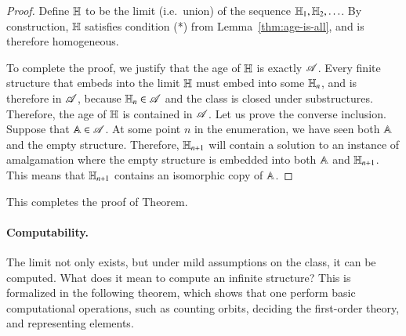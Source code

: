 \begin{proof}
		 Define $\mathbb H$ to be the limit (i.e.~union) of the sequence $\mathbb H_1,\mathbb H_2,\ldots$.  By construction, $\mathbb H$ satisfies condition (*) from Lemma~\ref{thm:age-is-all}, and is therefore homogeneous. 


		 
		 To complete the proof, we justify that the age of $\mathbb H$ is exactly $\mathscr A$. 
		 Every finite structure that embeds into the limit $\mathbb H$ must embed into some $\mathbb H_n$, and is therefore in $\mathscr A$, because $\mathbb H_n \in \mathscr A$ and the class is closed under substructures. Therefore, the age of $\mathbb H$ is contained in $\mathscr A$. Let us prove the converse inclusion. Suppose that $\mathbb A \in \mathscr A$. At some point $n$ in the enumeration, we have seen both $\mathbb A$ and the empty structure. Therefore, $\mathbb H_{n+1}$ will contain a solution to an instance of amalgamation where the empty structure is embedded into both $\mathbb A$ and $\mathbb H_{n+1}$. This means that $\mathbb H_{n+1}$ contains an isomorphic copy of $\mathbb A$.
	\end{proof}

This completes the proof of \fraisse Theorem. 


\paragraph*{Computability.} 
The \fraisse limit not only exists, but under mild assumptions on the \fraisse class, it can be computed. What does it mean to compute an infinite structure? This is formalized in the following theorem, which shows that one perform basic computational operations, such as counting orbits, deciding the first-order theory, and representing elements. 

